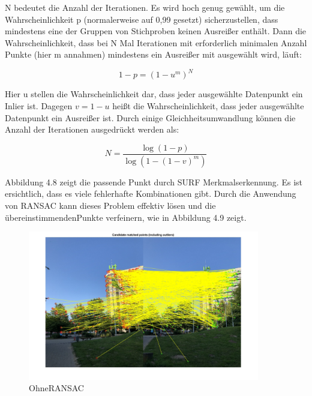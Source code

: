 N bedeutet die Anzahl der Iterationen. Es wird hoch genug gewählt, um die Wahrscheinlichkeit p (normalerweise auf 0,99 gesetzt) sicherzustellen, dass mindestens eine der Gruppen von Stichproben keinen Ausreißer enthält.
Dann die Wahrscheinlichkeit, dass bei N Mal Iterationen mit erforderlich minimalen Anzahl Punkte (hier m annahmen) mindestens ein Ausreißer mit ausgewählt wird, läuft:

\begin{equation}
   1 - p = (1 - u^m)^N
\end{equation}

Hier u stellen die Wahrscheinlichkeit dar, dass jeder ausgewählte Datenpunkt ein Inlier ist. Dagegen $v = 1 - u$ heißt die Wahrscheinlichkeit, dass jeder ausgewählte Datenpunkt ein Ausreißer ist. Durch einige Gleichheitsumwandlung können die Anzahl der Iterationen ausgedrückt werden als:

\begin{equation}
   N = \frac{\log(1 - p)}{\log(1 - (1 - v)^m)}
\end{equation}

Abbildung 4.8 zeigt die passende Punkt durch SURF Merkmalserkennung. Es ist ersichtlich, dass es viele fehlerhafte Kombinationen gibt. Durch die Anwendung von RANSAC kann dieses Problem effektiv lösen und die übereinstimmendenPunkte verfeinern, wie in Abbildung 4.9 zeigt.

\begin{figure}[H]
 \centering 
 \includegraphics[keepaspectratio,width=0.9\textwidth]{images/4_ZweiteErfahrung/RANSAC/OhneRANSAC.pdf}
 \caption{OhneRANSAC}
 \label{fig:OhneRANSAC}
\end{figure} 

